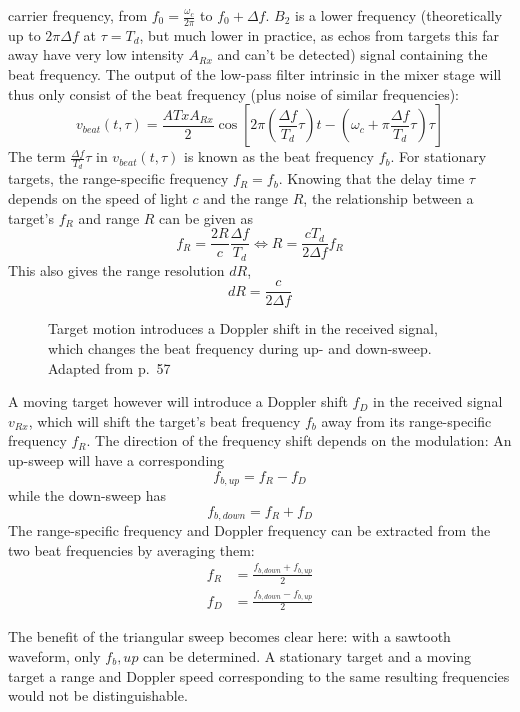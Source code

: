 carrier frequency, from \(f_0 = \frac{\omega_c}{2\pi}\) to
\(f_0 + \Delta f\). \(B_2\) is a lower frequency (theoretically up to
\(2\pi\Delta f\) at \(\tau = T_d\), but much lower in practice, as echos
from targets this far away have very low intensity \(A_{Rx}\) and can't
be detected) signal containing the beat frequency. The output of the
low-pass filter intrinsic in the mixer stage will thus only consist of
the beat frequency (plus noise of similar frequencies): \[
v_{beat}(t,\tau) = \frac{A{Tx}A_{Rx}}{2} \cos \left[ 2\pi\left(\frac{\Delta f}{T_d}\tau\right)t - \left(\omega_c + \pi\frac{\Delta f}{T_d}\tau \right) \tau \right]
\] The term \(\frac{\Delta f}{T_d}\tau\) in \(v_{beat}(t,\tau)\) is
known as the beat frequency \(f_b\). For stationary targets, the
range-specific frequency \(f_R = f_b\). Knowing that the delay time
\(\tau\) depends on the speed of light \(c\) and the range \(R\), the
relationship between a target's \(f_R\) and range \(R\) can be given as
\[
f_R = \frac{2R}{c} \frac{\Delta f}{T_d} \iff R=\frac{c T_d}{2\Delta f}f_R
\] This also gives the range resolution \(dR\), \[
dR = \frac{c}{2 \Delta f}
\]

\begin{figure}[htp]
    \centering
    \label{fig:fmcw_doppler}
    \def\svgwidth{10cm}
    
    \caption{Target motion introduces a Doppler shift in the received signal, which changes the beat frequency during up- and down-sweep. Adapted from \cite{Adams2012} p.~57}
\end{figure}

A moving target however will introduce a Doppler shift \(f_D\) in the
received signal \(v_{Rx}\), which will shift the target's beat frequency
\(f_b\) away from its range-specific frequency \(f_R\). The direction of
the frequency shift depends on the modulation: An up-sweep will have a
corresponding \[f_{b,up} = f_R - f_D\] while the down-sweep has
\[f_{b,down} = f_R + f_D\] The range-specific frequency and Doppler
frequency can be extracted from the two beat frequencies by averaging
them: \[
\begin{aligned}
f_R &= \frac{f_{b,down} + f_{b,up}}{2} \\
f_D &= \frac{f_{b,down} - f_{b,up}}{2}
\end{aligned}
\]

The benefit of the triangular sweep becomes clear here: with a sawtooth
waveform, only \(f_b,up\) can be determined. A stationary target and a
moving target a range and Doppler speed corresponding to the same
resulting frequencies would not be distinguishable.


